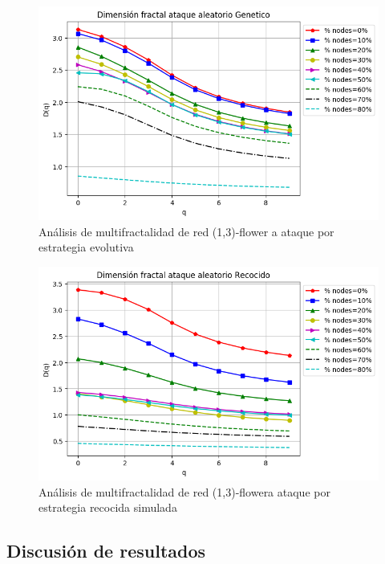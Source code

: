 \begin{figure}[H]
    \centering
    \includegraphics[scale=0.7]{Capitulo6MultifractalidadYRobustez/imagenes/grafica_DqGenetic20180501_151350floweru1v3.png}
    \caption{Análisis de multifractalidad de red (1,3)-flower a ataque por estrategia evolutiva }
\end{figure}

\begin{figure}[H]
    \centering
    \includegraphics[scale=0.7]{Capitulo6MultifractalidadYRobustez/imagenes/grafica_DqSimulated20180501_151350floweru1v3.png}
    \caption{Análisis de multifractalidad de red (1,3)-flowera ataque por estrategia recocida simulada }
\end{figure}

\subsection{Discusión de resultados}

